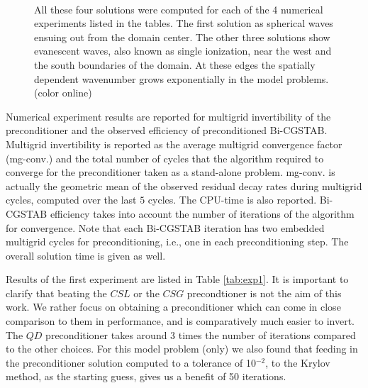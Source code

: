 \documentclass[mathpazo]{cicp}
\theoremstyle{definition}
\numberwithin{equation}{section}
\providecommand{\hbz}{}
\providecommand{\edt}{}
\begin{document}
\begin{figure}
\centering
{}
\\ 
\caption{All these four solutions were computed for each of the 4 numerical experiments listed in the tables. The first solution as spherical waves ensuing out from the domain center. The other three solutions show evanescent waves, also known as single ionization, near the west and the south boundaries of the domain. At these edges the spatially dependent wavenumber grows exponentially in the model problems. (color online)}
\label{fig:solplots}
\end{figure}

\hbz{Numerical experiment results are reported for multigrid invertibility of the preconditioner and the observed efficiency of preconditioned Bi-CGSTAB. Multigrid invertibility is reported as the average multigrid convergence factor (mg-conv.) and the total number of cycles that the algorithm required to converge for the preconditioner taken as a stand-alone problem. mg-conv. is actually the geometric mean of the observed residual decay \edt{rates during multigrid cycles}, computed over the last $5$ cycles. The CPU-time is also reported. Bi-CGSTAB efficiency takes into account the number of iterations of the algorithm for convergence. Note that each Bi-CGSTAB iteration has two embedded multigrid cycles for preconditioning, i.e., one in each preconditioning step. The overall solution time is given as well.}

Results of the first experiment are listed in Table \ref{tab:exp1}. It is important to clarify that beating the $CSL$ or the $CSG$ precondtioner is not the aim of this work. We rather focus on obtaining a preconditioner which can come in close comparison to them in performance, and is comparatively much easier to invert. The $QD$ preconditioner takes around 3 times the number of iterations compared to the other choices. For this model problem (only) we also found that feeding in the preconditioner solution computed to a tolerance of \edt{10$^{-2}$}, to the Krylov method, as the starting guess, gives us a benefit of 50 iterations.
\end{document}
